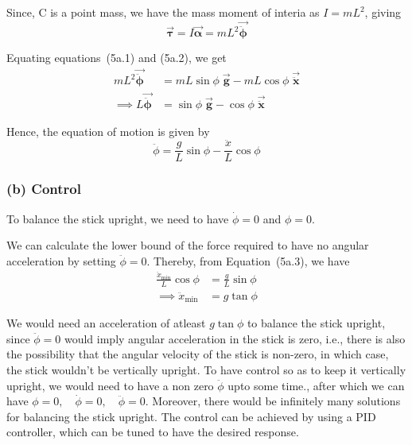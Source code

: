 Since, C is a point mass, we have the mass moment of interia as \( I = mL^2 \), giving
\begin{equation}
    \vec{\boldsymbol{\tau}} = I \vec{\boldsymbol{\alpha}} = mL^2 \vec{\ddot{\boldsymbol{\phi}}}
    \tag{5a.2}
\end{equation}

Equating equations~(5a.1) and (5a.2), we get
\begin{align*}
    mL^2 \vec{\ddot{\boldsymbol{\phi}}}
     & =
    mL\sin\phi \; \vec{\mathbf{g}} - mL\cos\phi \; \vec{\ddot{\mathbf{x}}} \\
    \implies
    L \vec{\ddot{\boldsymbol{\phi}}}
     & =
    \sin\phi \; \vec{\mathbf{g}} - \cos\phi \; \vec{\ddot{\mathbf{x}}}
\end{align*}

Hence, the equation of motion is given by
\begin{equation}
    \boxed{
        \ddot{\phi} = \frac{g}{L} \sin\phi - \frac{\ddot x}{L} \cos\phi
    }
    \tag{5a.3}
\end{equation}

\subsubsection*{(b) Control}

To balance the stick upright, we need to have \( \dot\phi = 0 \) and \( \phi = 0 \).

We can calculate the lower bound of the force required to have no angular acceleration by setting \( \ddot\phi = 0 \).
Thereby, from Equation~(5a.3), we have
\begin{align*}
    \frac{\ddot x_{\min}}{L} \cos\phi
     & =
    \frac{g}{L} \sin\phi
    \\ \implies
    \ddot x_{\min}
     & =
    g \tan\phi
\end{align*}

We would need an acceleration of atleast \( g \tan\phi \) to balance the stick upright, since \( \ddot \phi = 0\) would imply angular acceleration in the stick is zero, i.e., there is also the possibility that the angular velocity of the stick is non-zero, in which case, the stick wouldn't be vertically upright.
To have control so as to keep it vertically upright, we would need to have a non zero \( \ddot\phi \) upto some time., after which we can have \( \phi = 0, \quad \dot \phi = 0, \quad \ddot \phi = 0 \).
Moreover, there would be infinitely many solutions for balancing the stick upright.
The control can be achieved by using a PID controller, which can be tuned to have the desired response.

